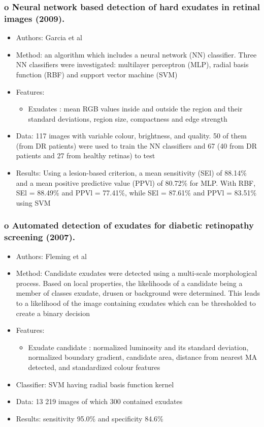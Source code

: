 \documentclass[12pt]{report}
\begin{document}
\subsubsection{o	Neural network based detection of hard exudates in retinal images (2009). \cite{garcia2009neural}}
\begin{itemize}
\item Authors: Garcia et al
\item Method: an algorithm which includes a neural network (NN) classifier. Three NN classifiers were investigated: multilayer perceptron (MLP), radial basis function (RBF) and support vector machine (SVM)
\item Features:
\begin{itemize}
\item Exudates : mean RGB values inside and outside the region and their standard deviations, region size, compactness and edge strength
\end{itemize}
\item Data: 117 images with variable colour, brightness, and quality. 50 of them (from DR patients) were used to train the NN classifiers and 67 (40 from DR patients and 27 from healthy retinas) to test
\item Results: Using a lesion-based criterion, a mean sensitivity (SEl) of 88.14\% and a mean positive predictive value (PPVl) of 80.72\% for MLP. With RBF, SEl = 88.49\% and PPVl = 77.41\%, while SEl = 87.61\% and PPVl = 83.51\% using SVM
\end{itemize}

\subsubsection{o    Automated detection of exudates for diabetic retinopathy screening (2007). \cite{fleming2007automated}}
\begin{itemize}
\item Authors: Fleming et al
\item Method: Candidate exudates were detected using a multi-scale morphological process. Based on local properties, the likelihoods of a candidate being a member of classes exudate, drusen or background were determined. This leads to a likelihood of the image containing exudates which can be thresholded to create a binary decision
\item Features:
\begin{itemize}
\item Exudate candidate : normalized luminosity and its standard deviation, normalized boundary gradient, candidate area, distance from nearest MA detected, and standardized colour features
\end{itemize}
\item Classifier: SVM having radial basis function kernel
\item Data: 13 219 images of which 300 contained exudates
\item Results: sensitivity 95.0\% and specificity 84.6\%
\end{itemize}
\end{document}

